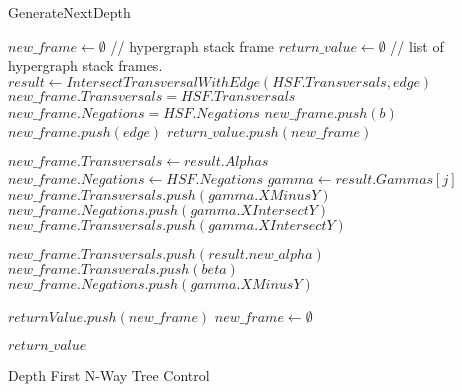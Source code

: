 \begin{algorithm}
	\caption{GenerateNextDepth}\label{GenerateNextDepth}
	\begin{algorithmic}[1]
		\State $new\_frame \gets \emptyset $ // hypergraph stack frame
		\State $return\_value \gets \emptyset $  // list of hypergraph stack frames.
		\State $result \gets IntersectTransversalWithEdge(HSF.Transversals,edge)$
		\State $new\_frame.Transversals = HSF.Transversals$ 
		\State $new\_frame.Negations = HSF.Negations$ 
		\State $new\_frame.push(b)$    
		\EndFor
		\Else
		\State $new\_frame.push(edge)$ 
		\EndIf
		\State $return\_value.push(new\_frame)$
		\EndIf
		\Else
		
			\State $new\_frame.Transversals \gets result.Alphas$
			\State $new\_frame.Negations \gets HSF.Negations$ 
				\State $gamma \gets result.Gammas[j]$
					\State $new\_frame.Transversals.push(gamma.XMinusY)$
					\State $new\_frame.Negations.push(gamma.XIntersectY)$
				\Else
					\State $new\_frame.Transversals.push(gamma.XIntersectY)$
				\EndIf
	
			\EndFor
				\State $new\_frame.Transversals.push(result.new\_alpha)$
				\EndIf
			\Else 
				\State $new\_frame.Transverals.push(beta)$
				\EndFor 
				\State $new\_frame.Negations.push(gamma.XMinusY)$
				\EndFor 
				\EndIf
			
			\EndIf
		\State $returnValue.push(new\_frame)$
		\State $new\_frame \gets \emptyset$
		\EndIf
		
		\EndFor
		\EndIf
		\State \Return $return\_value$
		\EndFunction
	\end{algorithmic}
\end{algorithm}


\newpage
Depth First N-Way Tree Control

